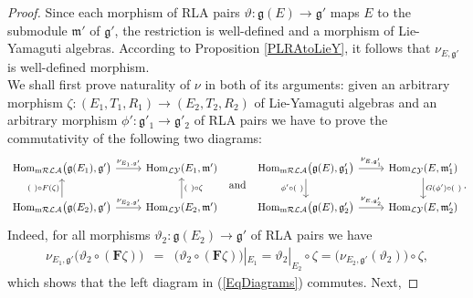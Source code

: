 \documentclass [11pt] {article}
\theoremstyle{definition}
\begin{document}
\begin{proof}
	Since each morphism of RLA pairs $\vartheta:\mathfrak{g}(E)\to \mathfrak{g}'$ maps
	$E$ to the submodule $\mathfrak{m}'$ of
	$\mathfrak{g}'$, the restriction is well-defined and
	a morphism of Lie-Yamaguti algebras. According to
	Proposition \ref{PLRAtoLieY}, it follows that 
	$\nu_{E,\mathfrak{g}'}$ is well-defined morphism.\\
	 We shall first prove naturality of $\nu$ in both of its arguments: given an arbitrary 
	 morphism $\zeta:(E_1,T_1,R_1)\to (E_2,T_2,R_2)$ of Lie-Yamaguti algebras and an arbitrary morphism $\phi':\mathfrak{g}'_1\to
	 \mathfrak{g}'_2$ of RLA pairs we have to prove the commutativity of the following two diagrams:
	 \begin{equation}\label{EqDiagrams}
	   \begin{tikzcd}
	    \mathrm{Hom}_{\mathrm{m}\mathcal{RLA}}
	    \big(\mathfrak{g}(E_1),\mathfrak{g}'\big)
	    \arrow[r, "\nu_{E_1,\mathfrak{g}'}"]
	    & \mathrm{Hom}_{\mathcal{LY}}(E_1,\mathfrak{m}')\\
	    \mathrm{Hom}_{\mathrm{m}\mathcal{RLA}}
	    \big(\mathfrak{g}(E_2),\mathfrak{g}'\big)
	    \arrow[r, "\nu_{E_2,\mathfrak{g}'}"]
	    \arrow[u, "(~)\circ F(\zeta)"]
	    & \mathrm{Hom}_{\mathcal{LY}}(E_2,\mathfrak{m}')
	     \arrow[u, "(~)\circ \zeta"']
	   \end{tikzcd}
	   ~~\mathrm{and}~~
	   \begin{tikzcd}
	   \mathrm{Hom}_{\mathrm{m}\mathcal{RLA}}
	   \big(\mathfrak{g}(E),\mathfrak{g}'_1\big)
	   \arrow[r, "\nu_{E,\mathfrak{g}_1'}"]
	   \arrow[d, "\phi'\circ (~)"']
	   & \mathrm{Hom}_{\mathcal{LY}}(E,\mathfrak{m}_1')
	   \arrow[d, "G(\phi')\circ(~)"]
	   \\
	   \mathrm{Hom}_{\mathrm{m}\mathcal{RLA}}
	   \big(\mathfrak{g}(E),\mathfrak{g}'_2\big)
	   \arrow[r, "\nu_{E,\mathfrak{g}_2'}"]
	   & \mathrm{Hom}_{\mathcal{LY}}(E,\mathfrak{m}_2')
	   \end{tikzcd}.
	 \end{equation}
	 Indeed,
	 for all morphisms $\vartheta_2:\mathfrak{g}(E_2)\to \mathfrak{g}'$ of RLA pairs we have 
	  \begin{eqnarray*}
	     \nu_{E_1,\mathfrak{g}'}
	     \big(\vartheta_2\circ (\mathbf{F}\zeta)\big) & = &
	     \big(\vartheta_2\circ (\mathbf{F}\zeta)\big)|_{E_1}
	     =\vartheta_2|_{E_2}\circ \zeta
	     =\big(\nu_{E_2,\mathfrak{g}'}(\vartheta_2)\big)
	       \circ \zeta,
	  \end{eqnarray*}
	  which shows that the left diagram in  (\ref{EqDiagrams}) commutes. Next,

\end{proof}
\end{document}
